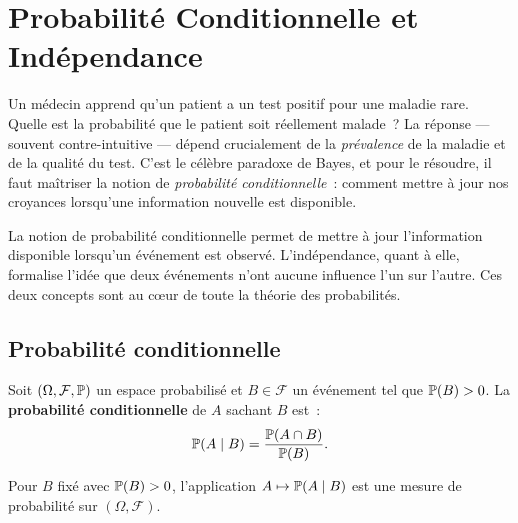 \chapter{Probabilit\'e Conditionnelle et Ind\'ependance}
\label{ch:conditionnelle}

Un m\'edecin apprend qu'un patient a un test positif pour une maladie rare.
Quelle est la probabilit\'e que le patient soit r\'eellement malade~? La
r\'eponse --- souvent contre-intuitive --- d\'epend crucialement de la
\emph{pr\'evalence} de la maladie et de la qualit\'e du test. C'est le
c\'el\`ebre \og paradoxe\fg{} de Bayes, et pour le r\'esoudre, il faut
ma\^itriser la notion de \emph{probabilit\'e conditionnelle}~: comment
mettre \`a jour nos croyances lorsqu'une information nouvelle est
disponible.

\begin{intuition}
La notion de probabilit\'e conditionnelle permet de mettre \`a jour l'information
disponible lorsqu'un \'ev\'enement est observ\'e. L'ind\'ependance, quant \`a elle,
formalise l'id\'ee que deux \'ev\'enements n'ont aucune influence l'un sur l'autre.
Ces deux concepts sont au c\oe ur de toute la th\'eorie des probabilit\'es.
\end{intuition}

\section{Probabilit\'e conditionnelle}

\begin{definition}
Soit $(\Omega, \mathcal{F}, \mathbb{P})$ un espace probabilis\'e et $B \in \mathcal{F}$
un \'ev\'enement tel que $\mathbb{P}(B) > 0$. La \textbf{probabilit\'e conditionnelle}
de $A$ sachant $B$ est~:
\[
    \mathbb{P}(A \mid B) = \frac{\mathbb{P}(A \cap B)}{\mathbb{P}(B)}.
\]
\end{definition}

\begin{proposition}
Pour $B$ fix\'e avec $\mathbb{P}(B) > 0$, l'application $A \mapsto \mathbb{P}(A \mid B)$
est une mesure de probabilit\'e sur $(\Omega, \mathcal{F})$.
\end{proposition}

